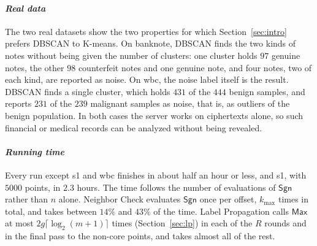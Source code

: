 \paragraph{\emph{Real data}}
The two real datasets show the two properties for which
Section~\ref{sec:intro} prefers DBSCAN to K-means. On banknote, DBSCAN
finds the two kinds of notes without being given the number of clusters:
one cluster holds $97$ genuine notes, the other $98$ counterfeit notes
and one genuine note, and four notes, two of each kind, are reported as
noise. On wbc, the noise label itself is the result. DBSCAN finds a
single cluster, which holds $431$ of the $444$ benign samples, and
reports $231$ of the $239$ malignant samples as noise, that is, as
outliers of the benign population. In both cases the server works on
ciphertexts alone, so such financial or medical records can be analyzed
without being revealed.

\paragraph{\emph{Running time}}
Every run except s1 and wbc finishes in about half an hour or less, and
s1, with $5000$ points, in $2.3$ hours. The time follows the number of
evaluations of $\mathsf{Sgn}$ rather than $n$ alone. Neighbor Check
evaluates $\mathsf{Sgn}$ once per offset, $k_{\max}$ times in total, and
takes between $14\%$ and $43\%$ of the time. Label Propagation calls
$\mathsf{Max}$ at most $2g \lceil \log_2(m+1) \rceil$ times
(Section~\ref{sec:lp}) in each of the $R$ rounds and in the final pass
to the non-core points, and takes almost all of the rest.



